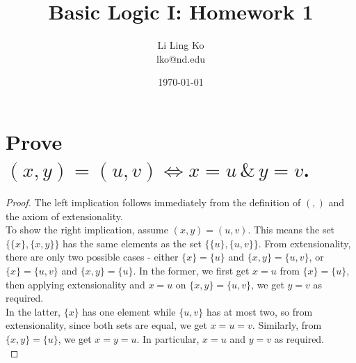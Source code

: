 \documentclass{article}
\begin{document}
\title{Basic Logic I: Homework 1}
\author{Li Ling Ko\\ lko@nd.edu}
\date{\today}
\maketitle

\section{Prove $(x,y) = (u,v) \Leftrightarrow x = u \, \& \, y = v$.}
\begin{proof}
  The left implication follows immediately from the definition of $(,)$ and
  the axiom of extensionality. \\

  To show the right implication, assume $(x,y) = (u,v)$. This means the set
  $\{\{x\}, \{x,y\}\}$ has the same elements as the set $\{\{u\}, \{u,v\}\}$.
  From extensionality, there are only two possible cases - either $\{x\} =
  \{u\}$ and $\{x,y\} = \{u,v\}$, or $\{x\} = \{u,v\}$ and $\{x,y\} = \{u\}$.
  In the former, we first get $x = u$ from $\{x\} = \{u\}$, then applying
  extensionality and $x=u$ on $\{x,y\} = \{u,v\}$, we get $y=v$ as required.
  \\

  In the latter, $\{x\}$ has one element while $\{u,v\}$ has at most two, so
  from extensionality, since both sets are equal, we get $x=u=v$. Similarly,
  from $\{x,y\} = \{u\}$, we get $x=y=u$. In particular, $x=u$ and $y=v$ as
  required. \\
\end{proof}
\end{document}
